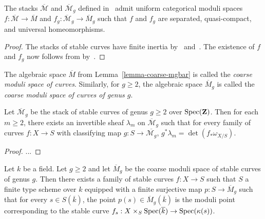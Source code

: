 \begin{lemma}
\label{lemma-coarse-mgbar}
The stacks $\overline{\mathcal{M}}$ and $\overline{\mathcal{M}}_g$
defined in~ admit uniform categorical moduli spaces
$f : \overline{\mathcal{M}} \to \overline{M}$ and
$f_g : \overline{\mathcal{M}}_g \to \overline{M}_g$ such that $f$ and $f_g$
are separated, quasi-compact, and universal homeomorphisms.
\end{lemma}

\begin{proof}
The stacks of stable curves have finite inertia by~
and~.
The existence of $f$ and $f_g$ now follows from by~.
\end{proof}

\begin{definition}
\label{definition-deligne-mumford-coarse}
The algebraic space $\overline{M}$ from Lemma~\ref{lemma-coarse-mgbar} is
called the \emph{coarse moduli space of curves}.
Similarly, for $g \geq 2$, the algebraic space $\overline{M}_g$ is called the
\emph{coarse moduli space of curves of genus $g$}.
\end{definition}

\begin{lemma}
\label{lemma-mgbar-hodge-bundle}
Let $\overline{\mathcal{M}}_g$ be the stack of stable curves of genus $g \geq
2$ over $\mathop{\rm Spec}(\mathbf{Z})$.
Then for each $m \geq 2$, there exists an invertible sheaf $\lambda_m$ on
$\overline{\mathcal{M}}_g$ such that for every family of curves $f : X \to S$
with classifying map $g : S \to \overline{\mathcal{M}_g}$,
$g^*\lambda_m = \det(f_*\omega_{X/S})$.
\end{lemma}

\begin{proof}
...
\end{proof}

\begin{lemma}
\label{lemma-family-with-all-curves}
Let $k$ be a field.
Let $g \geq 2$ and let $\overline{M}_g$ be the coarse moduli space of stable
curves of genus $g$.
Then there exists a family of stable curves $f : X \to S$ such that
$S$ a finite type scheme over $k$ equipped with a finite surjective map
$p : S \to \overline{M}_g$ such that for every
$s \in S(\overline k)$, the point $p(s) \in \overline{M}_g(\overline k)$ is
the moduli point corresponding to the stable curve
$f_s : X \times_S \mathop{\rm Spec}(\overline k) \to \mathop{\rm Spec}(\kappa(s))$.
\end{lemma}

